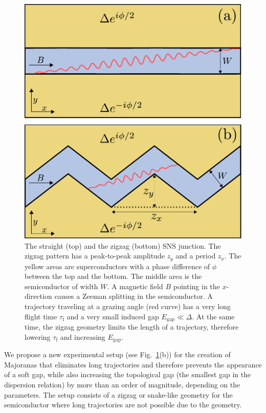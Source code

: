 \begin{figure}
\begin{center}
\includegraphics[width=0.6\columnwidth]{chapter_zigzag/figures/zigzag.pdf}
\caption{The straight (top) and the zigzag (bottom) SNS junction.
The zigzag pattern has a peak-to-peak amplitude $z_y$ and a period $z_x$.
The yellow areas are superconductors with a phase difference of $\phi$ between the top and the bottom.
The middle area is the semiconductor of width $W$.
A magnetic field $B$ pointing in the $x$-direction causes a Zeeman splitting in the semiconductor.
A trajectory traveling at a grazing angle (red curve) has a very long flight time $\tau_\textrm{f}$ and a very small induced gap $E_\textrm{gap} \ll \Delta$.
At the same time, the zigzag geometry limits the length of a trajectory, therefore lowering $\tau_\textrm{f}$ and increasing $E_\textrm{gap}$.
\label{fig:setup}}
\end{center}
\end{figure}

We propose a new experimental setup (see Fig.~\ref{fig:setup}(b)) for the creation of Majoranas that eliminates long trajectories and therefore prevents the appearance of a soft gap, while also increasing the topological gap (the smallest gap in the dispersion relation) by more than an order of magnitude, depending on the parameters.
The setup consists of a zigzag or snake-like geometry for the semiconductor where long trajectories are not possible due to the geometry.

